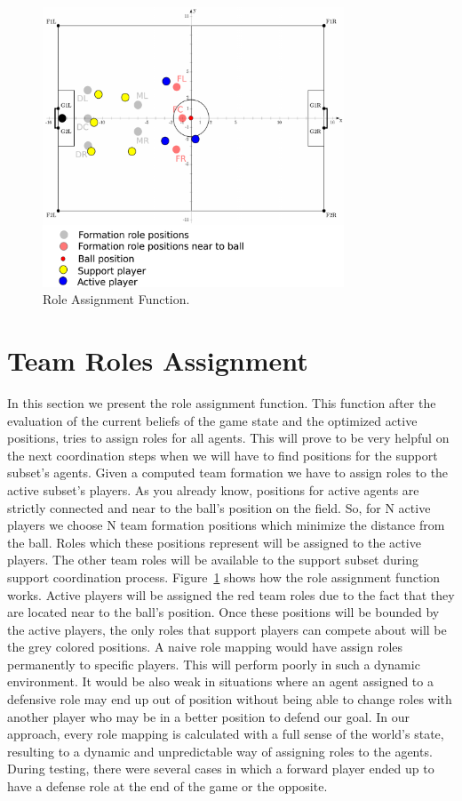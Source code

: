 \begin{figure}[t!]
\centering
  \includegraphics[width=0.8\textwidth]{Chapter4/figures/RoleAss.pdf}
  \caption{Role Assignment Function.} 
  \label{fig:RoleAss}
\end{figure}


\section{Team Roles Assignment}
In this section we present the role assignment function. This function after the evaluation of the current beliefs of the game state and the optimized active positions, tries to assign roles for all agents. This will prove to be very helpful on the next coordination steps when we will have to find positions for the support subset's agents. Given a computed team formation we have to assign roles to the active subset's players. As you already know, positions for active agents are strictly connected and near to the ball's position on the field. So, for N active players we choose N team formation positions which minimize the distance from the ball. Roles which these positions represent will be assigned to the active players. The other team roles will be available to the support subset during support coordination process. Figure~\ref{fig:RoleAss} shows how the role assignment function works. Active players will be assigned the red team roles due to the fact that they are located near to the ball's position. Once these positions will be bounded by the active players, the only roles that support players can compete about will be the grey colored positions. A naive role mapping would have assign roles permanently to specific players. This will perform poorly in such a dynamic environment. It would be also weak in situations where an agent assigned to a defensive role may end up out of position without being able to change roles with another player who may be in a better position to defend our goal. In our approach, every role mapping is calculated with a full sense of the world's state, resulting to a dynamic and unpredictable way of assigning roles to the agents. During testing, there were several cases in which a forward player ended up to have a defense role at the end of the game or the opposite.


